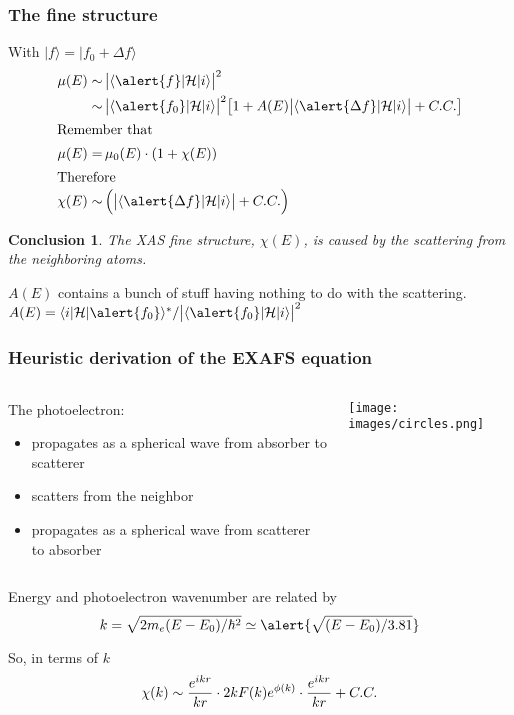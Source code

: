 \documentclass[10pt, xcolor=x11names, compress]{beamer}
\newtheorem{conclusion}[theorem]{Conclusion}
\begin{document}
\begin{frame}
  \frametitle{The fine structure}
  With $|f\rangle = |f_0+\Delta f\rangle$
  \begin{align}
    \mu(E) \sim&\, \big|\langle \alert{f}| \mathcal{H}|i\rangle\big|^2
    \notag\\
    \sim&\, \big|\langle \alert{f_0}| \mathcal{H}|i\rangle\big|^2
    \big[
    1 + A(E)
    \big|\langle \alert{\Delta f}| \mathcal{H}|i\rangle\big|
    + C.C.
    \big]\notag\\
    \intertext{Remember that}
    \mu(E) =&\, \mu_0(E) \cdot (1+\chi(E))\notag\\
    \intertext{Therefore}
    \chi(E) \sim&\,\Big(\big|\langle \alert{\Delta f}|
    \mathcal{H}|i\rangle\big| + C.C.\Big)\notag
  \end{align}

  \begin{conclusion}
    The XAS fine structure, $\chi(E)$, is caused by the scattering from
    the neighboring atoms.
  \end{conclusion}

  \begin{bottomnote}[0.6][19.25]
    $A(E)$ contains a bunch of stuff having nothing to do with the
    scattering. $A(E) = \langle
    i|\mathcal{H}|\alert{f_0}\rangle^\ast / \big|\langle
    \alert{f_0}| \mathcal{H}|i\rangle\big|^2$
  \end{bottomnote}
\end{frame}

\begin{frame}
  \frametitle{Heuristic derivation of the EXAFS equation}
  \begin{columns}
    \begin{column}{0.5\linewidth}
      The photoelectron:
      \begin{itemize}
      \item propagates as a spherical wave from absorber to scatterer
      \item scatters from the neighbor
      \item propagates as a spherical wave from scatterer to absorber
      \end{itemize}
    \end{column}
    \begin{column}{0.5\linewidth}
      \texttt{[image: images/circles.png]}
    \end{column}
  \end{columns}
  
  \bigskip

  Energy and photoelectron wavenumber are related by
  \begin{equation}
    k = \sqrt{2m_e(E-E_0)/\hbar^2} \simeq \alert{\sqrt{(E-E_0)/3.81}}\notag
  \end{equation}

  So, in terms of $k$
  \begin{equation}
    \chi(k) \sim \frac{e^{ikr}}{kr} \cdot
    2kF(k)e^{\phi(k)} \cdot
    \frac{e^{ikr}}{kr} + C.C.
    \notag
  \end{equation}
\end{frame}
\end{document}
